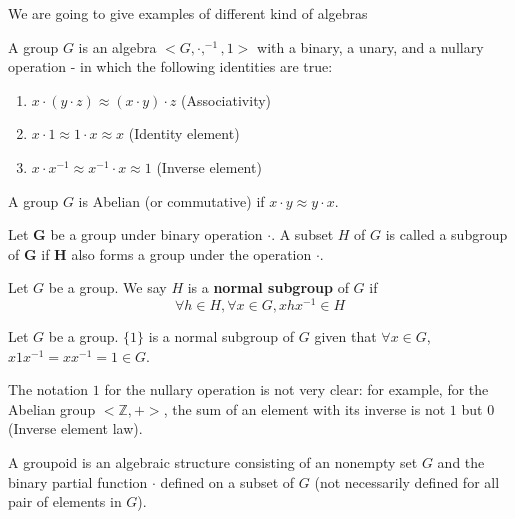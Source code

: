 \begin{example} We are going to give examples of different kind of algebras
  \begin{definition}[group] A group $G$ is an algebra $<G, \cdot, ^{-1},1>$ with
a binary, a unary, and a nullary operation - in which the following identities
are true:
    \begin{enumerate}
    \item $x \cdot (y \cdot z) \approx (x \cdot y) \cdot z$ (Associativity)
    \item $x \cdot 1 \approx 1 \cdot x \approx x$ (Identity element)
    \item $x \cdot x^{-1} \approx x^{-1} \cdot x \approx 1$ (Inverse element)
    \end{enumerate}

    A group $G$ is Abelian (or commutative) if $x \cdot y \approx y \cdot x$.
  \end{definition}

  \begin{definition}[subgroup]
    Let $\boldsymbol{G}$ be a group under binary operation $\cdot$. A subset $H$
    of $G$ is called a subgroup of $\boldsymbol{G}$ if $\boldsymbol{H}$ also
    forms a group under the operation $\cdot$.
  \end{definition}

  \begin{definition}
    Let $G$ be a group. We say $H$ is a \textbf{normal subgroup} of $G$ if
    \begin{equation}
      \label{eq:subgroup}
      \forall h \in H, \forall x \in G, xhx^{-1} \in H
    \end{equation}
  \end{definition}

  \begin{example}
    Let $G$ be a group. $\{1\}$ is a normal subgroup of $G$ given that $\forall x \in G$, $x1x^{-1} = xx^{-1} = 1 \in G$.
  \end{example}

  \begin{remark} The notation $1$ for the nullary operation is not very clear:
for example, for the Abelian group $<\mathbb{Z}, +>$, the sum of an element with
its inverse is not $1$ but $0$ (Inverse element law).
  \end{remark}

  \begin{definition}[groupoid] A groupoid is an algebraic structure consisting
of an nonempty set $G$ and the binary partial function $\cdot$ defined on a
subset of $G$ (not necessarily defined for all pair of elements in $G$).
  \end{definition}


\end{example}
